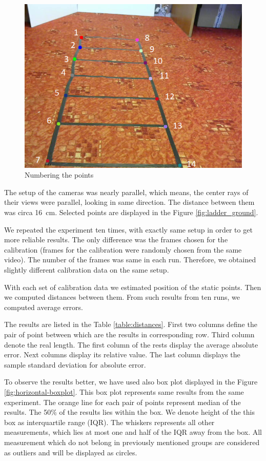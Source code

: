 \begin{figure}
\centering
\includegraphics[width=0.8\linewidth]{img/experiments/right-ladder-numbered.png}
\caption{Numbering the points}
\label{fig:ladder_numbered}
\end{figure}

The setup of the cameras was nearly parallel, which means, the center rays of
their views were parallel, looking in same direction. The distance between them
was circa 16~cm. Selected points are displayed in the Figure
\ref{fig:ladder_ground}. 

We repeated the experiment ten times, with exactly same setup in order to get
more reliable results. The only difference was the frames chosen for the
calibration (frames for the calibration were randomly chosen from the same
video). The number of the frames was same in each run. Therefore, we obtained
slightly different calibration data on the same setup.

With each set of calibration data we estimated position of the static points.
Then we computed distances between them. From such results from ten runs, we
computed average errors.

The results are listed in the Table \ref{table:distances}. First two columns
define the pair of point between which are the results in corresponding row.
Third column denote the real length. The first column of the rests display the
average absolute error. Next columns display its relative value. The last
column displays the sample standard deviation for absolute error. 

To observe the results better, we have used also box plot displayed in the
Figure \ref{fig:horizontal-boxplot}. This box plot represents same results from the
same experiment. The orange line for each pair of points represent median of
the results. The 50\% of the results lies within the box. We denote height of
the this box as interquartile range (IQR). The whiskers represents all other
measurements, which lies at most one and half of the IQR away from the box. All
measurement which do not belong in previously mentioned groups are considered
as outliers and  will be displayed as circles.


